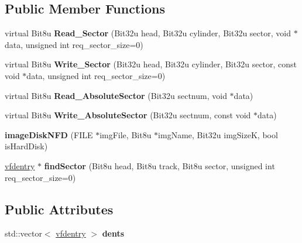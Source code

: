 \subsection*{Public Member Functions}
\begin{DoxyCompactItemize}
\item 
\hypertarget{classimageDiskNFD_a68592ca82b6289dac88f11496b1786d1}{virtual Bit8u {\bfseries Read\-\_\-\-Sector} (Bit32u head, Bit32u cylinder, Bit32u sector, void $\ast$data, unsigned int req\-\_\-sector\-\_\-size=0)}\label{classimageDiskNFD_a68592ca82b6289dac88f11496b1786d1}

\item 
\hypertarget{classimageDiskNFD_a29a3ca3ba569ad27e53736b4bdbdf6a7}{virtual Bit8u {\bfseries Write\-\_\-\-Sector} (Bit32u head, Bit32u cylinder, Bit32u sector, const void $\ast$data, unsigned int req\-\_\-sector\-\_\-size=0)}\label{classimageDiskNFD_a29a3ca3ba569ad27e53736b4bdbdf6a7}

\item 
\hypertarget{classimageDiskNFD_a3ff96b9c95f7e612a8defb028ea7d926}{virtual Bit8u {\bfseries Read\-\_\-\-Absolute\-Sector} (Bit32u sectnum, void $\ast$data)}\label{classimageDiskNFD_a3ff96b9c95f7e612a8defb028ea7d926}

\item 
\hypertarget{classimageDiskNFD_ac5a037cce6076f95d27a1b8c25f3695b}{virtual Bit8u {\bfseries Write\-\_\-\-Absolute\-Sector} (Bit32u sectnum, const void $\ast$data)}\label{classimageDiskNFD_ac5a037cce6076f95d27a1b8c25f3695b}

\item 
\hypertarget{classimageDiskNFD_ad0d05917587f2e706613c99de7beb7ca}{{\bfseries image\-Disk\-N\-F\-D} (F\-I\-L\-E $\ast$img\-File, Bit8u $\ast$img\-Name, Bit32u img\-Size\-K, bool is\-Hard\-Disk)}\label{classimageDiskNFD_ad0d05917587f2e706613c99de7beb7ca}

\item 
\hypertarget{classimageDiskNFD_aa4e6f7762a0c622d8c829a7bdf179f66}{\hyperlink{structimageDiskNFD_1_1vfdentry}{vfdentry} $\ast$ {\bfseries find\-Sector} (Bit8u head, Bit8u track, Bit8u sector, unsigned int req\-\_\-sector\-\_\-size=0)}\label{classimageDiskNFD_aa4e6f7762a0c622d8c829a7bdf179f66}

\end{DoxyCompactItemize}
\subsection*{Public Attributes}
\begin{DoxyCompactItemize}
\item 
\hypertarget{classimageDiskNFD_a5a8485ee6b315c4d0a77e5443d9d1e2f}{std\-::vector$<$ \hyperlink{structimageDiskNFD_1_1vfdentry}{vfdentry} $>$ {\bfseries dents}}\label{classimageDiskNFD_a5a8485ee6b315c4d0a77e5443d9d1e2f}

\end{DoxyCompactItemize}


